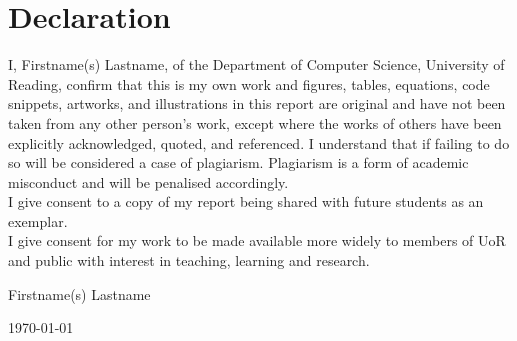 \documentclass[a4paper,11pt,oneside]{book}
\begin{document}
    
    \newpage
    \thispagestyle{empty}
    \chapter*{\Large Declaration}
    I,
     Firstname(s) Lastname, %
    of the Department of Computer Science, University of Reading, confirm that this is my own work and figures, tables, equations, code snippets, artworks, and illustrations in this report are original and have not been taken from any other person's work, except where the works of others have been explicitly acknowledged, quoted, and referenced. I understand that if failing to do so will be considered a case of plagiarism. Plagiarism is a form of academic misconduct and will be penalised accordingly. \\
    
    \noindent
    I give consent to a copy of my report being shared with future students as an exemplar. \\
    
    \noindent
    I give consent for my work to be made available more widely to members of UoR and public with interest in teaching, learning and research. 
    ~\\[1cm]
    \begin{flushright}
	Firstname(s) Lastname %
    
    \today
    \end{flushright}

     
    
\end{document}
